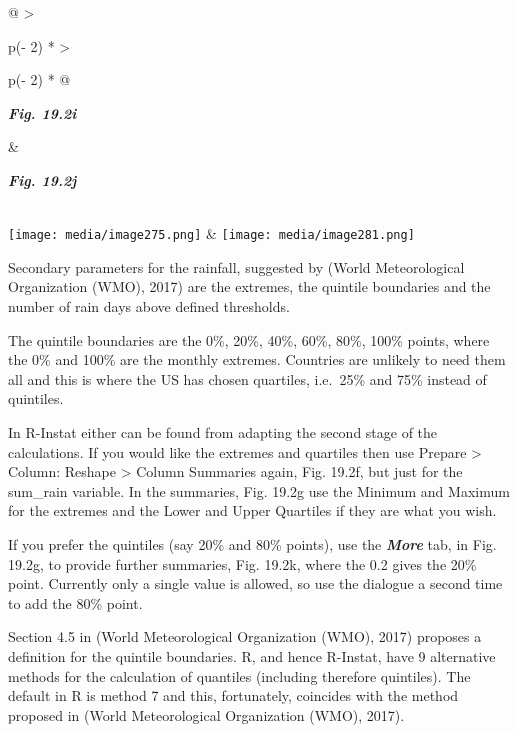 \documentclass[
  letterpaper,
  DIV=11,
  numbers=noendperiod]{scrreprt}
\begin{document}
\begin{longtable}[]{@{}
  >{\raggedright\arraybackslash}p{(\columnwidth - 2\tabcolsep) * }
  >{\raggedright\arraybackslash}p{(\columnwidth - 2\tabcolsep) * }@{}}
\toprule\noalign{}
\begin{minipage}[b]{\linewidth}\raggedright
\textbf{\emph{Fig. 19.2i}}
\end{minipage} & \begin{minipage}[b]{\linewidth}\raggedright
\textbf{\emph{Fig. 19.2j}}
\end{minipage} \\
\midrule\noalign{}
\endhead
\bottomrule\noalign{}
\endlastfoot
\texttt{[image: media/image275.png]} &
\texttt{[image: media/image281.png]} \\
\end{longtable}

Secondary parameters for the rainfall, suggested by (World
Meteorological Organization (WMO), 2017) are the extremes, the quintile
boundaries and the number of rain days above defined thresholds.

The quintile boundaries are the 0\%, 20\%, 40\%, 60\%, 80\%, 100\%
points, where the 0\% and 100\% are the monthly extremes. Countries are
unlikely to need them all and this is where the US has chosen quartiles,
i.e.~25\% and 75\% instead of quintiles.

In R-Instat either can be found from adapting the second stage of the
calculations. If you would like the extremes and quartiles then use
Prepare \textgreater{} Column: Reshape \textgreater{} Column Summaries
again, Fig. 19.2f, but just for the sum\_rain variable. In the
summaries, Fig. 19.2g use the Minimum and Maximum for the extremes and
the Lower and Upper Quartiles if they are what you wish.

If you prefer the quintiles (say 20\% and 80\% points), use the
\textbf{\emph{More}} tab, in Fig. 19.2g, to provide further summaries,
Fig. 19.2k, where the 0.2 gives the 20\% point. Currently only a single
value is allowed, so use the dialogue a second time to add the 80\%
point.

Section 4.5 in (World Meteorological Organization (WMO), 2017) proposes
a definition for the quintile boundaries. R, and hence R-Instat, have 9
alternative methods for the calculation of quantiles (including
therefore quintiles). The default in R is method 7 and this,
fortunately, coincides with the method proposed in (World Meteorological
Organization (WMO), 2017).
\end{document}
